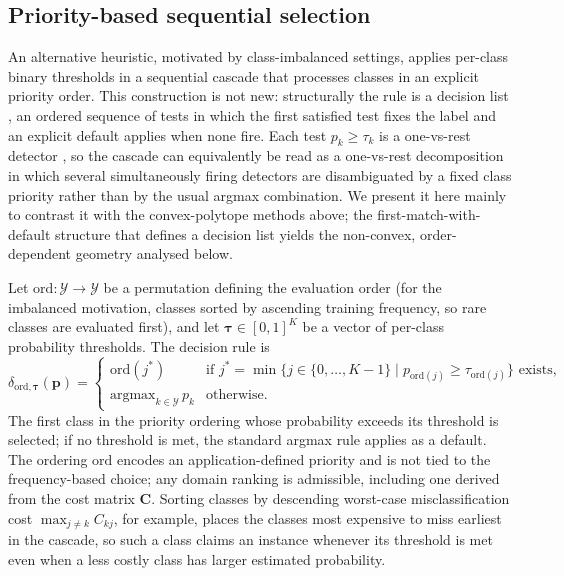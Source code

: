 \subsection{Priority-based sequential selection}\label{sec:sequential_selection}

An alternative heuristic, motivated by class-imbalanced settings, applies per-class binary thresholds in a sequential cascade that processes classes in an explicit priority order. This construction is not new: structurally the rule is a decision list \citep{rivest1987decision}, an ordered sequence of tests in which the first satisfied test fixes the label and an explicit default applies when none fire. Each test $p_k \ge \tau_k$ is a one-vs-rest detector \citep{rifkin2004defense}, so the cascade can equivalently be read as a one-vs-rest decomposition in which several simultaneously firing detectors are disambiguated by a fixed class priority rather than by the usual argmax combination. We present it here mainly to contrast it with the convex-polytope methods above; the first-match-with-default structure that defines a decision list yields the non-convex, order-dependent geometry analysed below.

Let $\mathrm{ord}: \mathcal{Y} \to \mathcal{Y}$ be a permutation defining the evaluation order (for the imbalanced motivation, classes sorted by ascending training frequency, so rare classes are evaluated first), and let $\boldsymbol{\tau} \in [0,1]^K$ be a vector of per-class probability thresholds. The decision rule is
\begin{equation}\label{eq:sequential_selection}
    \delta_{\mathrm{ord}, \boldsymbol{\tau}}(\mathbf{p}) = \begin{cases}
        \mathrm{ord}(j^*) & \text{if } j^* = \min\{j \in \{0, \ldots, K{-}1\} \mid p_{\mathrm{ord}(j)} \geq \tau_{\mathrm{ord}(j)}\} \text{ exists}, \\
        \mathrm{argmax}_{k \in \mathcal{Y}}\, p_k & \text{otherwise}.
    \end{cases}
\end{equation}
The first class in the priority ordering whose probability exceeds its threshold is selected; if no threshold is met, the standard argmax rule applies as a default. The ordering $\mathrm{ord}$ encodes an application-defined priority and is not tied to the frequency-based choice; any domain ranking is admissible, including one derived from the cost matrix $\mathbf{C}$. Sorting classes by descending worst-case misclassification cost $\max_{j \neq k} C_{kj}$, for example, places the classes most expensive to miss earliest in the cascade, so such a class claims an instance whenever its threshold is met even when a less costly class has larger estimated probability.

